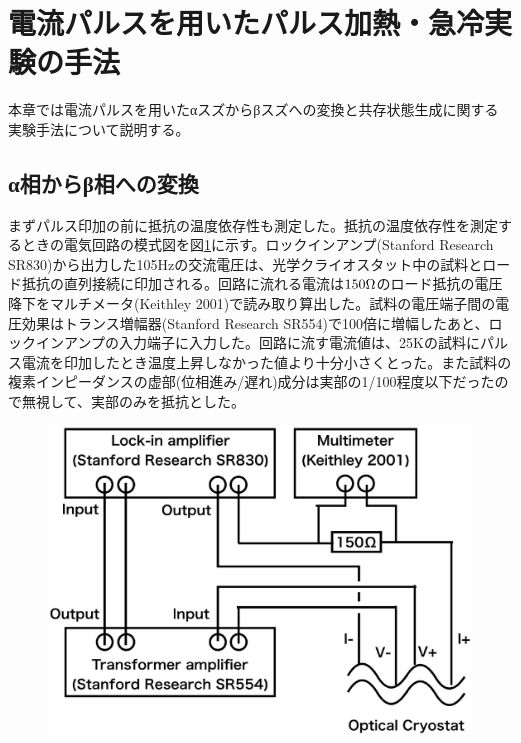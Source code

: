 \section{電流パルスを用いたパルス加熱・急冷実験の手法}
本章では電流パルスを用いたαスズからβスズへの変換と共存状態生成に関する実験手法について説明する。

\subsection{α相からβ相への変換}
まずパルス印加の前に抵抗の温度依存性も測定した。抵抗の温度依存性を測定するときの電気回路の模式図を図\ref{fig:schematics_lockin}に示す。ロックインアンプ(Stanford Research SR830)から出力した105Hzの交流電圧は、光学クライオスタット中の試料とロード抵抗の直列接続に印加される。回路に流れる電流は$\rm 150\Omega$のロード抵抗の電圧降下をマルチメータ(Keithley 2001)で読み取り算出した。試料の電圧端子間の電圧効果はトランス増幅器(Stanford Research SR554)で100倍に増幅したあと、ロックインアンプの入力端子に入力した。回路に流す電流値は、25Kの試料にパルス電流を印加したとき温度上昇しなかった値より十分小さくとった。また試料の複素インピーダンスの虚部(位相進み/遅れ)成分は実部の1/100程度以下だったので無視して、実部のみを抵抗とした。
\begin{figure}[!h]
     \begin{center}
   \includegraphics[width=0.5\hsize]{experiment/schematics_lockin.eps}
  \end{center}
  \caption{}
  \label{fig:schematics_lockin}
\end{figure}


